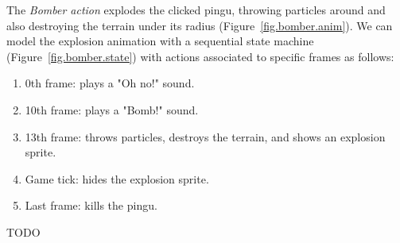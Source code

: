 \documentclass{vgtc}                          %
\begin{document}
The \emph{Bomber action} explodes the clicked pingu, throwing particles around
and also destroying the terrain under its radius (Figure~\ref{fig.bomber.anim}).
%
We can model the explosion animation with a sequential state machine
(Figure~\ref{fig.bomber.state}) with actions associated to specific frames as
follows:
%
\begin{enumerate}
\item 0th frame:  plays a "Oh no!" sound.
\item 10th frame: plays a "Bomb!" sound.
\item 13th frame: throws particles, destroys the terrain, and shows an
                  explosion sprite.
\item Game tick:  hides the explosion sprite.
\item Last frame: kills the pingu.
\end{enumerate}

TODO
\end{document}
